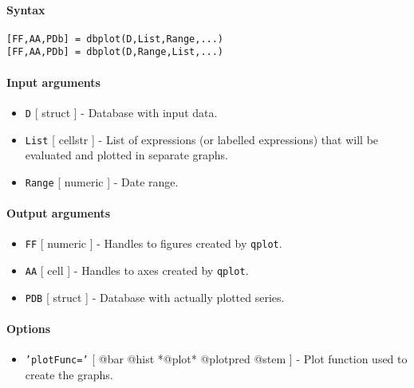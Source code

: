 


	\paragraph{Syntax}

\begin{verbatim}
[FF,AA,PDb] = dbplot(D,List,Range,...)
[FF,AA,PDb] = dbplot(D,Range,List,...)
\end{verbatim}

\paragraph{Input arguments}

\begin{itemize}
\item
  \texttt{D} {[} struct {]} - Database with input data.
\item
  \texttt{List} {[} cellstr {]} - List of expressions (or labelled
  expressions) that will be evaluated and plotted in separate graphs.
\item
  \texttt{Range} {[} numeric {]} - Date range.
\end{itemize}

\paragraph{Output arguments}

\begin{itemize}
\item
  \texttt{FF} {[} numeric {]} - Handles to figures created by
  \texttt{qplot}.
\item
  \texttt{AA} {[} cell {]} - Handles to axes created by \texttt{qplot}.
\item
  \texttt{PDB} {[} struct {]} - Database with actually plotted series.
\end{itemize}

\paragraph{Options}

\begin{itemize}
\itemsep1pt\parskip0pt
\item
  \texttt{'plotFunc='} {[} @bar \textbar{} @hist \textbar{} *@plot*
  \textbar{} @plotpred \textbar{} @stem {]} - Plot function used to
  create the graphs.
\end{itemize}

